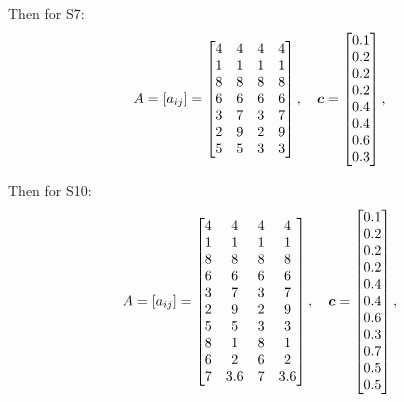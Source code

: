 Then for S7:
$$
A=[a_{ij}] = \begin{bmatrix}
4 & 4 & 4 & 4 \\
1 & 1 & 1 & 1 \\
8 & 8 & 8 & 8 \\
6 & 6 & 6 & 6 \\
3 & 7 & 3 & 7 \\
2 & 9 & 2 & 9 \\
5 & 5 & 3 & 3 \\
\end{bmatrix},
\quad
\boldsymbol{c} = \begin{bmatrix} 0.1 \\ 0.2 \\ 0.2 \\ 0.2 \\ 0.4 \\ 0.4 \\ 0.6 \\ 0.3 \end{bmatrix},
$$

Then for S10:
$$
A=[a_{ij}] = \begin{bmatrix}
4 & 4 & 4 & 4 \\
1 & 1 & 1 & 1 \\
8 & 8 & 8 & 8 \\
6 & 6 & 6 & 6 \\
3 & 7 & 3 & 7 \\
2 & 9 & 2 & 9 \\
5 & 5 & 3 & 3 \\
8 & 1 & 8 & 1 \\
6 & 2 & 6 & 2 \\
7 & 3.6 & 7 & 3.6
\end{bmatrix},
\quad
\boldsymbol{c} = \begin{bmatrix} 0.1 \\ 0.2 \\ 0.2 \\ 0.2 \\ 0.4 \\ 0.4 \\ 0.6 \\ 0.3 \\ 0.7 \\ 0.5 \\ 0.5 \end{bmatrix},
$$